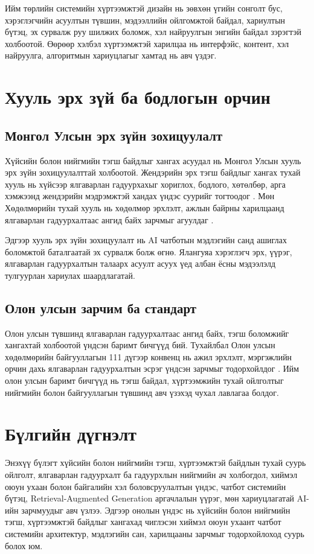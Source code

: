 Ийм төрлийн системийн хүртээмжтэй дизайн нь зөвхөн үгийн сонголт бус, хэрэглэгчийн асуултын түвшин, мэдээллийн ойлгомжтой байдал, хариултын бүтэц, эх сурвалж руу шилжих боломж, хэл найруулгын энгийн байдал зэрэгтэй холбоотой. Өөрөөр хэлбэл хүртээмжтэй харилцаа нь интерфэйс, контент, хэл найруулга, алгоритмын хариуцлагыг хамтад нь авч үздэг.


\section{Хууль эрх зүй ба бодлогын орчин}

\subsection{Монгол Улсын эрх зүйн зохицуулалт}

Хүйсийн болон нийгмийн тэгш байдлыг хангах асуудал нь Монгол Улсын хууль эрх зүйн зохицуулалттай холбоотой. Жендэрийн эрх тэгш байдлыг хангах тухай хууль нь хүйсээр ялгаварлан гадуурхахыг хориглох, бодлого, хөтөлбөр, арга хэмжээнд жендэрийн мэдрэмжтэй хандах үндэс суурийг тогтоодог \cite{mn_gender_law}. Мөн Хөдөлмөрийн тухай хууль нь хөдөлмөр эрхлэлт, ажлын байрны харилцаанд ялгаварлан гадуурхалтаас ангид байх зарчмыг агуулдаг \cite{mn_labor_law}.

Эдгээр хууль эрх зүйн зохицуулалт нь AI чатботын мэдлэгийн санд ашиглах боломжтой баталгаатай эх сурвалж болж өгнө. Ялангуяа хэрэглэгч эрх, үүрэг, ялгаварлан гадуурхалтын талаарх асуулт асуух үед албан ёсны мэдээлэлд тулгуурлан хариулах шаардлагатай.

\subsection{Олон улсын зарчим ба стандарт}

Олон улсын түвшинд ялгаварлан гадуурхалтаас ангид байх, тэгш боломжийг хангахтай холбоотой үндсэн баримт бичгүүд бий. Тухайлбал Олон улсын хөдөлмөрийн байгууллагын 111 дүгээр конвенц нь ажил эрхлэлт, мэргэжлийн орчин дахь ялгаварлан гадуурхалтын эсрэг үндсэн зарчмыг тодорхойлдог \cite{ilo_c111}. Ийм олон улсын баримт бичгүүд нь тэгш байдал, хүртээмжийн тухай ойлголтыг нийгмийн болон байгууллагын түвшинд авч үзэхэд чухал лавлагаа болдог.


\section{Бүлгийн дүгнэлт}

Энэхүү бүлэгт хүйсийн болон нийгмийн тэгш, хүртээмжтэй байдлын тухай суурь ойлголт, ялгаварлан гадуурхалт ба гадуурхлын нийгмийн ач холбогдол, хиймэл оюун ухаан болон байгалийн хэл боловсруулалтын үндэс, чатбот системийн бүтэц, Retrieval-Augmented Generation аргачлалын үүрэг, мөн хариуцлагатай AI-ийн зарчмуудыг авч үзлээ. Эдгээр онолын үндэс нь хүйсийн болон нийгмийн тэгш, хүртээмжтэй байдлыг хангахад чиглэсэн хиймэл оюун ухаант чатбот системийн архитектур, мэдлэгийн сан, харилцааны зарчмыг тодорхойлоход суурь болох юм.